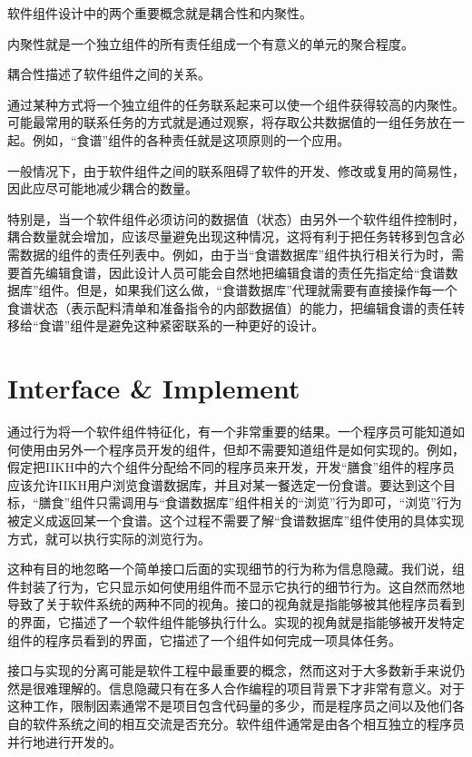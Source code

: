 软件组件设计中的两个重要概念就是耦合性和内聚性。

\begin{compactitem}
\item 内聚性就是一个独立组件的所有责任组成一个有意义的单元的聚合程度。
\item 耦合性描述了软件组件之间的关系。
\end{compactitem}

通过某种方式将一个独立组件的任务联系起来可以使一个组件获得较高的内聚性。可能最常用的联系任务的方式就是通过观察，将存取公共数据值的一组任务放在一起。例如，“食谱”组件的各种责任就是这项原则的一个应用。


一般情况下，由于软件组件之间的联系阻碍了软件的开发、修改或复用的简易性，因此应尽可能地减少耦合的数量。

特别是，当一个软件组件必须访问的数据值（状态）由另外一个软件组件控制时，耦合数量就会增加，应该尽量避免出现这种情况，这将有利于把任务转移到包含必需数据的组件的责任列表中。例如，由于当“食谱数据库”组件执行相关行为时，需要首先编辑食谱，因此设计人员可能会自然地把编辑食谱的责任先指定给“食谱数据库”组件。但是，如果我们这么做，“食谱数据库”代理就需要有直接操作每一个食谱状态（表示配料清单和准备指令的内部数据值）的能力，把编辑食谱的责任转移给“食谱”组件是避免这种紧密联系的一种更好的设计。

\section{Interface \& Implement}


通过行为将一个软件组件特征化，有一个非常重要的结果。一个程序员可能知道如何使用由另外一个程序员开发的组件，但却不需要知道组件是如何实现的。例如，假定把IIKH中的六个组件分配给不同的程序员来开发，开发“膳食”组件的程序员应该允许IIKH用户浏览食谱数据库，并且对某一餐选定一份食谱。要达到这个目标，“膳食”组件只需调用与“食谱数据库”组件相关的“浏览”行为即可，“浏览”行为被定义成返回某一个食谱。这个过程不需要了解“食谱数据库”组件使用的具体实现方式，就可以执行实际的浏览行为。


这种有目的地忽略一个简单接口后面的实现细节的行为称为信息隐藏。我们说，组件封装了行为，它只显示如何使用组件而不显示它执行的细节行为。这自然而然地导致了关于软件系统的两种不同的视角。接口的视角就是指能够被其他程序员看到的界面，它描述了一个软件组件能够执行什么。实现的视角就是指能够被开发特定组件的程序员看到的界面，它描述了一个组件如何完成一项具体任务。


接口与实现的分离可能是软件工程中最重要的概念，然而这对于大多数新手来说仍然是很难理解的。信息隐藏只有在多人合作编程的项目背景下才非常有意义。对于这种工作，限制因素通常不是项目包含代码量的多少，而是程序员之间以及他们各自的软件系统之间的相互交流是否充分。软件组件通常是由各个相互独立的程序员并行地进行开发的。

